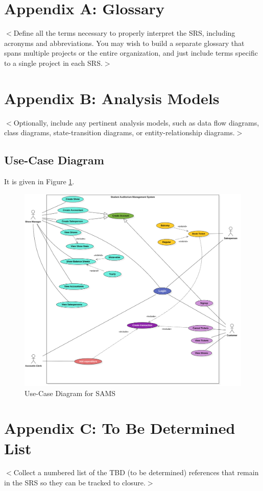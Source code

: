 \documentclass{scrreprt}
\begin{document}
\section{Appendix A: Glossary}
$<$Define all the terms necessary to properly interpret the SRS, including 
acronyms and abbreviations. You may wish to build a separate glossary that spans 
multiple projects or the entire organization, and just include terms specific to 
a single project in each SRS.$>$

\section{Appendix B: Analysis Models}
$<$Optionally, include any pertinent analysis models, such as data flow 
diagrams, class diagrams, state-transition diagrams, or entity-relationship 
diagrams.$>$
\subsection{Use-Case Diagram}
It is given in Figure \ref{fig:use-case}.
\begin{figure}
	\centering
	\includegraphics[width=1.2\textwidth]{UseCaseDiagramCrop.png}
	\caption{Use-Case Diagram for SAMS}
	\label{fig:use-case}
\end{figure}

\section{Appendix C: To Be Determined List}
$<$Collect a numbered list of the TBD (to be determined) references that remain 
in the SRS so they can be tracked to closure.$>$
\end{document}
